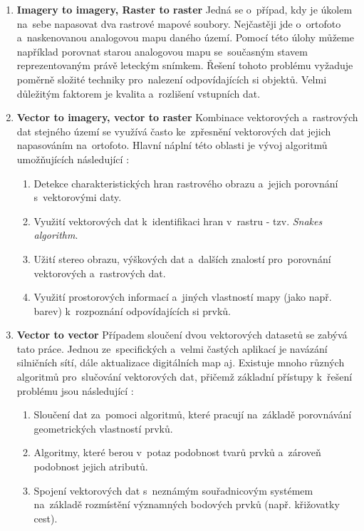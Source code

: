\begin{enumerate}
  \item \textbf{Imagery to imagery, Raster to raster}
    \subitem Jedná se o~případ, kdy je úkolem na~sebe napasovat dva rastrové 
      mapové soubory. Nejčastěji jde o~ortofoto a~naskenovanou analogovou mapu
      daného území. Pomocí této úlohy můžeme například porovnat starou analogovou
      mapu se~současným stavem reprezentovaným právě leteckým snímkem. 
      Řešení tohoto problému vyžaduje poměrně složité techniky pro~nalezení 
      odpovídajících si objektů. Velmi důležitým faktorem je kvalita a~rozlišení
      vstupních dat.
  \item \textbf{Vector to imagery, vector to raster}
    \subitem Kombinace vektorových a~rastrových dat stejného území se využívá 
      často ke~zpřesnění vektorových dat jejich napasováním na~ortofoto. Hlavní
      náplní této oblasti je vývoj algoritmů umožňujících následující 
      \cite{gisencyclopedia}: 
	      \begin{enumerate}
	       \item Detekce charakteristických hran rastrového obrazu a~jejich 
		  porovnání s~vektorovými daty.
	       \item Využití vektorových dat k~identifikaci hran v~rastru - tzv. 
		  \textit{Snakes algorithm}.
	       \item Užití stereo obrazu, výškových dat a~dalších znalostí
		  pro~porovnání vektorových a~rastrových dat. 
	       \item Využití prostorových informací a~jiných vlastností mapy 
		  (jako např. barev) k~roz\-poznání odpovídajících si prvků.
	      \end{enumerate}
  \item \textbf{Vector to vector} \nopagebreak
    \subitem Případem sloučení dvou vektorových datasetů se zabývá tato práce. 
	Jednou ze~spe\-cifických a~velmi častých aplikací je navázání silničních 
	sítí, dále aktualizace digitál\-ních map aj. Existuje mnoho různých algoritmů
	pro~slučování vektorových dat, přičemž základní přístupy k~řešení problému 
	jsou následující \cite{gisencyclopedia}: 
	      \begin{enumerate}
	       \item Sloučení dat za~pomoci algoritmů, které pracují na~základě 
		  porovnávání geome\-trických vlastností prvků.
	       \item Algoritmy, které berou v~potaz podobnost tvarů prvků a~zároveň
		  podobnost jejich atributů.
	       \item Spojení vektorových dat s~neznámým souřadnicovým systémem 
		  na~základě rozmí\-stění významných bodových prvků (např. křižovatky 
		  cest).
	      \end{enumerate}

\end{enumerate}

